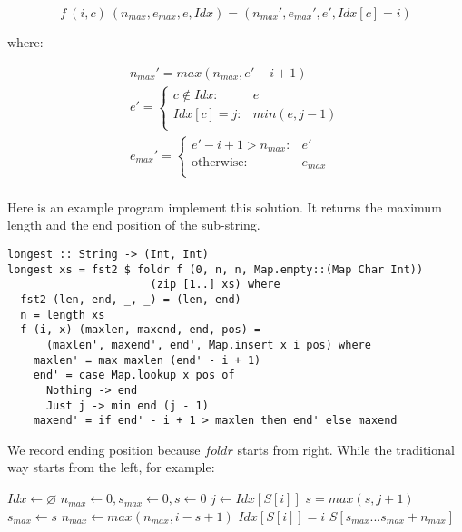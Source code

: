 \documentclass[UTF8]{article}
\begin{document}
\begin{enumerate}
\[
f\ (i, c)\ (n_{max}, e_{max}, e, Idx) = (n_{max}', e_{max}', e', Idx[c] = i)
\]

where:

\[ \begin{array}{l}
n_{max}' = max(n_{max}, e' - i + 1) \\
e' = \begin{cases}
  c \notin Idx: & e \\
  Idx[c] = j: & min(e, j - 1) \\
  \end{cases} \\
e_{max}' = \begin{cases}
  e' - i + 1 > n_{max}: & e' \\
  \text{otherwise}: & e_{max} \\
  \end{cases} \\
\end{array} \]

Here is an example program implement this solution. It returns the maximum length and the end position of the sub-string.

\lstset{frame=single}
\begin{lstlisting}
longest :: String -> (Int, Int)
longest xs = fst2 $ foldr f (0, n, n, Map.empty::(Map Char Int))
                      (zip [1..] xs) where
  fst2 (len, end, _, _) = (len, end)
  n = length xs
  f (i, x) (maxlen, maxend, end, pos) =
      (maxlen', maxend', end', Map.insert x i pos) where
    maxlen' = max maxlen (end' - i + 1)
    end' = case Map.lookup x pos of
      Nothing -> end
      Just j -> min end (j - 1)
    maxend' = if end' - i + 1 > maxlen then end' else maxend
\end{lstlisting}

We record ending position because $foldr$ starts from right. While the traditional way starts from the left, for example:

\begin{algorithmic}
  \State $Idx \gets \varnothing$
  \State $n_{max} \gets 0, s_{max} \gets 0, s \gets 0$
      \State $j \gets Idx[S[i]]$
      \State $s = max(s, j + 1)$
    \EndIf
      \State $s_{max} \gets s$
    \EndIf
    \State $n_{max} \gets max(n_{max}, i - s + 1)$
    \State $Idx[S[i]] = i$
  \EndFor
  \State \Return $S[s_{max} ... s_{max} + n_{max}]$
\EndFunction
\end{algorithmic}


\end{enumerate}
\end{document}
